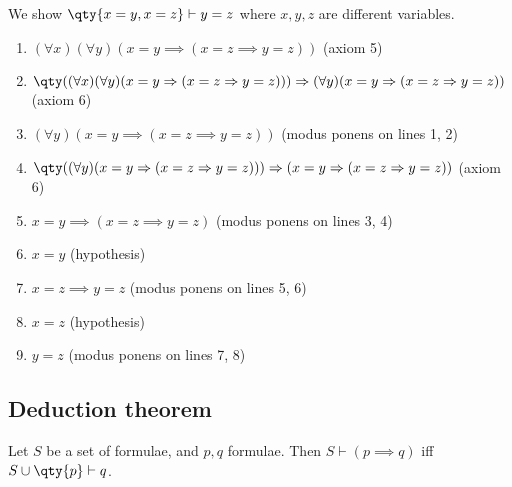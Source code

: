 \begin{example}
    We show $\qty{x = y, x = z} \vdash y = z$ where $x, y, z$ are different variables.
    \begin{enumerate}
        \item $(\forall x)(\forall y)(x = y \implies (x = z \implies y = z))$ (axiom 5)
        \item $\qty((\forall x)(\forall y)(x = y \implies (x = z \implies y = z))) \implies (\forall y)(x = y \implies (x = z \implies y = z))$ (axiom 6)
        \item $(\forall y)(x = y \implies (x = z \implies y = z))$ (modus ponens on lines 1, 2)
        \item $\qty((\forall y)(x = y \implies (x = z \implies y = z))) \implies (x = y \implies (x = z \implies y = z))$ (axiom 6)
        \item $x = y \implies (x = z \implies y = z)$ (modus ponens on lines 3, 4)
        \item $x = y$ (hypothesis)
        \item $x = z \implies y = z$ (modus ponens on lines 5, 6)
        \item $x = z$ (hypothesis)
        \item $y = z$ (modus ponens on lines 7, 8)
    \end{enumerate}
\end{example}

\subsection{Deduction theorem}

\begin{proposition} \label{prp:predded}
    Let $S$ be a set of formulae, and $p, q$ formulae.
    Then $S \vdash (p \implies q)$ iff $S \cup \qty{p} \vdash q$.
\end{proposition}

